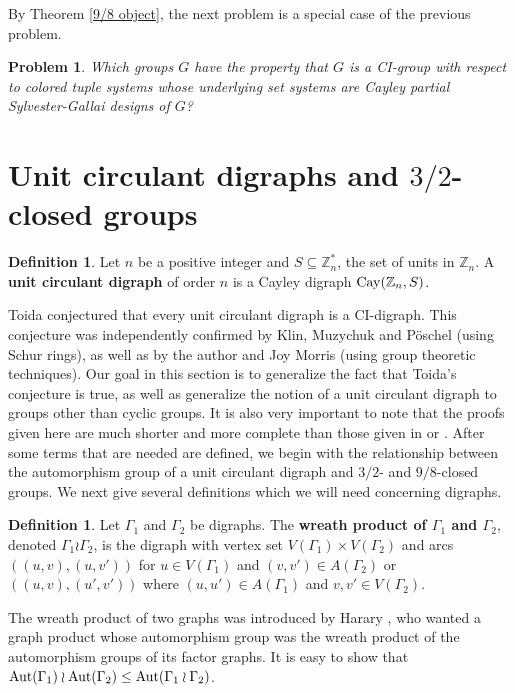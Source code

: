 \documentclass{amsart}
\newtheorem{problem}[thrm]{Problem}
\theoremstyle{definition}
\newtheorem{definition}[thrm]{Definition}
\theoremstyle{remark}
\numberwithin{equation}{section}
\def\Z{{\mathbb Z}}
\def\Aut{{\rm Aut}}
\def\Cay{{\rm Cay}}
\begin{document}
By Theorem \ref{9/8 object}, the next problem is a special case of the previous problem.

\begin{problem}
Which groups $G$ have the property that $G$ is a CI-group with respect to colored tuple systems whose underlying set systems are Cayley partial Sylvester-Gallai designs of $G$?
\end{problem}

\section{Unit circulant digraphs and $3/2$-closed groups}

\begin{definition}
Let $n$ be a positive integer and $S\subseteq\Z_n^*$, the set of units in $\Z_n$.  A {\bf unit circulant digraph} of order $n$ is a Cayley digraph $\Cay(\Z_n,S)$.
\end{definition}

Toida \cite{Toida1977} conjectured that every unit circulant digraph is a CI-digraph.  This conjecture was independently confirmed by Klin, Muzychuk and P\"oschel  \cite{MuzychukKP2001} (using Schur rings), as well as by the author and Joy Morris \cite{DobsonM2002} (using group theoretic techniques).  Our goal in this section is to generalize the fact that Toida's conjecture is true, as well as generalize the notion of a unit circulant digraph to groups other than cyclic groups.  It is also very important to note that the proofs given here are much shorter and more complete than those given in \cite{MuzychukKP2001} or \cite{DobsonM2002}.  After some terms that are needed are defined, we begin with the relationship between the automorphism group of a unit circulant digraph and $3/2$- and $9/8$-closed groups.  We next give several definitions which we will need concerning digraphs.

\begin{definition}
Let $\Gamma_1$ and $\Gamma_2$ be digraphs.  The {\bf wreath product of $\Gamma_1$ and $\Gamma_2$}, denoted $\Gamma_1\wr\Gamma_2$, is the digraph with vertex set $V(\Gamma_1)\times V(\Gamma_2)$ and arcs $((u,v),(u,v'))$ for $u\in V(\Gamma_1)$ and $(v,v')\in A(\Gamma_2)$ or $((u,v),(u',v'))$ where $(u,u')\in A(\Gamma_1)$ and $v,v'\in V(\Gamma_2)$.
\end{definition}

The wreath product of two graphs was introduced by Harary \cite{Harary1959}, who wanted a graph product whose automorphism group was the wreath product of the automorphism groups of its factor graphs.  It is easy to show that $\Aut(\Gamma_1)\wr\Aut(\Gamma_2)\le\Aut(\Gamma_1\wr\Gamma_2)$.
\end{document}
